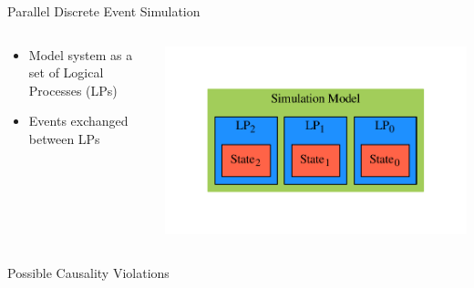 \documentclass[10pt]{beamer}
\begin{document}
\begin{frame}{Parallel Discrete Event Simulation}

    \begin{columns}[c]

    \begin{column}{0.4\textwidth}
        \begin{itemize}
            \item Model system as a set of Logical Processes (LPs)
            \item Events exchanged between LPs
        \end{itemize}
    \end{column}

    \begin{column}{0.6\textwidth}
        \includegraphics[width=\textwidth]{../figs/graphviz/pdes.pdf}
    \end{column}

    \end{columns}

    \vspace{-\bigskipamount}
    \vspace{-\bigskipamount}
    \begin{block}{Possible Causality Violations}
    \vspace{-\bigskipamount}

        \begin{columns}


\end{columns}
\end{block}
\end{frame}
\end{document}
